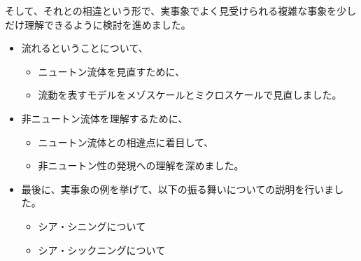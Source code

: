\documentclass[uplatex,dvipdfmx,a4paper,11pt]{jsreport}
\begin{document}
そして、それとの相違という形で、実事象でよく見受けられる複雑な事象を少しだけ理解できるように検討を進めました。
\begin{boxnote}
    \begin{itemize}
		\item 流れるということについて、
		\begin{itemize}
			\item ニュートン流体を見直すために、
			\item 流動を表すモデルをメゾスケールとミクロスケールで見直しました。
		\end{itemize} 
		\item 非ニュートン流体を理解するために、
		\begin{itemize}
			\item ニュートン流体との相違点に着目して、
			\item 非ニュートン性の発現への理解を深めました。
		\end{itemize} 
		\item 最後に、実事象の例を挙げて、以下の振る舞いについての説明を行いました。
		\begin{itemize}
			\item シア・シニングについて
			\item シア・シックニングについて
		\end{itemize}
	\end{itemize}
\end{boxnote}

\clearpage
\end{document}
